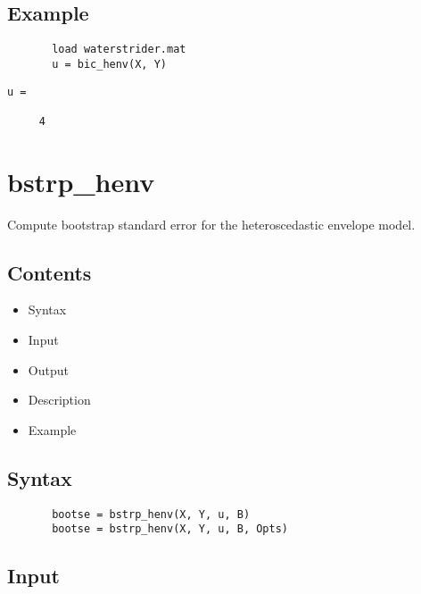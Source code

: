 \documentclass[a4paper,11pt,openany]{memoir}
\begin{document}
\subsection*{Example}


\begin{verbatim}       load waterstrider.mat
       u = bic_henv(X, Y)\end{verbatim}
    
        \color{lightgray}\ttfamily \begin{verbatim}
u =

     4

\end{verbatim} \rmfamily
\color{black}

\newpage

\rmfamily
\color{black}\section{bstrp\_henv}

\begin{par}
Compute bootstrap standard error for the heteroscedastic envelope model.
\end{par} \vspace{1em}

\subsection*{Contents}

\begin{itemize}
\setlength{\itemsep}{-1ex}
   \item Syntax
   \item Input
   \item Output
   \item Description
   \item Example
\end{itemize}


\subsection*{Syntax}


\begin{verbatim}       bootse = bstrp_henv(X, Y, u, B)
       bootse = bstrp_henv(X, Y, u, B, Opts)\end{verbatim}
    

\subsection*{Input}
\end{document}
